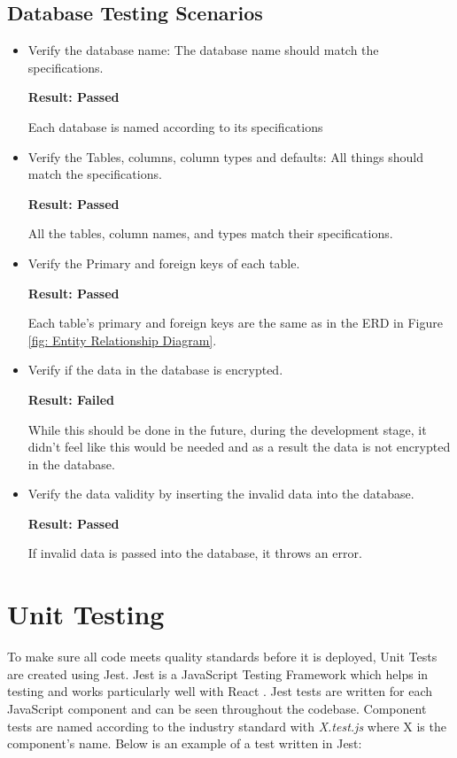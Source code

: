 \subsection{Database Testing Scenarios}
\begin{itemize}
    \item Verify the database name: The database name should match the specifications.

    \textbf{Result: Passed}

    Each database is named according to its specifications

    \item Verify the Tables, columns, column types and defaults: All things should match the specifications.

    \textbf{Result: Passed}

    All the tables, column names, and types match their specifications.

    \item Verify the Primary and foreign keys of each table.

    \textbf{Result: Passed}

    Each table's primary and foreign keys are the same as in the ERD in Figure \ref{fig: Entity Relationship Diagram}.

    \item Verify if the data in the database is encrypted.

    \textbf{Result: Failed}

    While this should be done in the future, during the development stage, it didn't feel like this would be needed and as a result the data is not encrypted in the database.

    \item Verify the data validity by inserting the invalid data into the database.

    \textbf{Result: Passed}

    If invalid data is passed into the database, it throws an error.
\end{itemize}


\section{Unit Testing}

To make sure all code meets quality standards before it is deployed, Unit Tests are created using Jest. Jest is a JavaScript Testing Framework which helps in testing and works particularly well with React \parencite{Reference34}. Jest tests are written for each JavaScript component and can be seen throughout the codebase. Component tests are named according to the industry standard with \textit{X.test.js} where X is the component's name. Below is an example of a test written in Jest:

